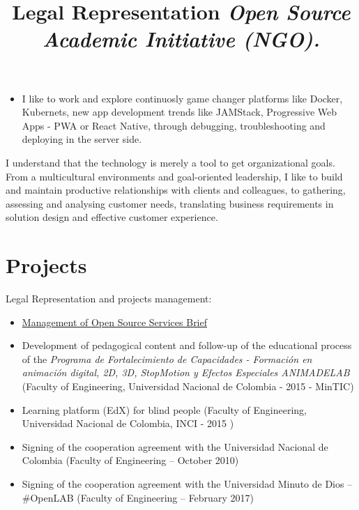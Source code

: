 \documentclass[overlapped,line,final]{res}
\begin{document}
\begin{resume}
\begin{itemize}
    \item I like to work and explore continuosly game changer platforms like Docker, Kubernets, new app development trends like JAMStack, Progressive Web Apps - PWA or React Native, through debugging, troubleshooting and deploying in the server side.
\end{itemize}
    
I understand that the technology is merely a tool to get organizational goals. From a multicultural environments and goal-oriented leadership, I like to build and maintain productive relationships with clients and colleagues, to gathering, assessing and analysing customer needs, translating business requirements in solution design and effective customer experience.

\vspace{0.5cm}
\section{\sc Projects } %
\vspace{0.5cm}
\title{\bf Legal Representation
	\newline \em Open Source Academic Initiative (NGO).
}
\begin{position}
Legal Representation and projects management:

\begin{itemize}
\item \href{https://opensai.org/business}{Management of Open Source Services Brief}
\item Development of pedagogical content and follow-up of the educational process of the \textit{Programa de Fortalecimiento de Capacidades - Formación en animación digital, 2D, 3D, StopMotion y Efectos Especiales ANIMADELAB} (Faculty of Engineering, Universidad Nacional de Colombia - 2015 - MinTIC)
\item Learning platform (EdX) for blind people (Faculty of Engineering, Universidad Nacional de Colombia, INCI - 2015 )
\item Signing of the cooperation agreement with the Universidad Nacional de Colombia (Faculty of Engineering – October 2010)
\item Signing of the cooperation agreement with the Universidad Minuto de Dios – \#OpenLAB (Faculty of Engineering – February 2017)
\end{itemize}


\end{position}
\end{resume}
\end{document}
